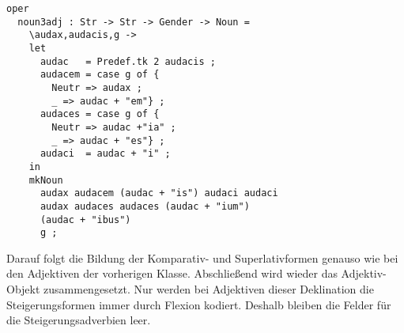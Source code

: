 \begin{lstlisting}[float=h!tp,caption={Deklinationsfunktion für die "`Nomenformen"' der Adjektive der dritten Deklination (vgl. \textbf{ResLat.gf})},label={GF-Res-Noun3Adj},basicstyle=\small]
oper
  noun3adj : Str -> Str -> Gender -> Noun = 
    \audax,audacis,g ->
    let 
      audac   = Predef.tk 2 audacis ;
      audacem = case g of {
        Neutr => audax ; 
        _ => audac + "em"} ;
      audaces = case g of {
        Neutr => audac +"ia" ; 
        _ => audac + "es"} ;
      audaci  = audac + "i" ;
    in
    mkNoun
      audax audacem (audac + "is") audaci audaci 
      audax audaces audaces (audac + "ium") 
      (audac + "ibus") 
      g ;
\end{lstlisting}
Darauf folgt die Bildung der Komparativ- und Superlativformen genauso wie bei den Adjektiven der vorherigen Klasse. Abschließend wird wieder das Adjektiv-Objekt zusammengesetzt. Nur werden bei Adjektiven dieser Deklination die Steigerungsformen immer durch Flexion kodiert. Deshalb bleiben die Felder für die Steigerungsadverbien leer.
